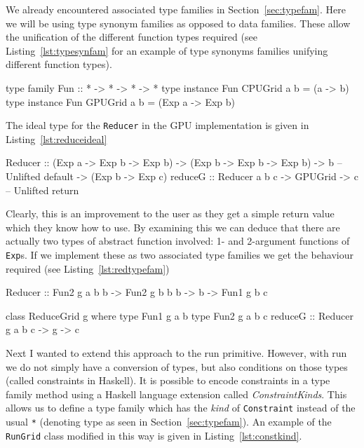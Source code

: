 \documentclass[12pt,a4paper,twoside]{scrbook}
\begin{document}
We already encountered associated type families in
Section~\ref{sec:typefam}. Here we will be using type synonym families as
opposed to data families. These allow the unification of the different function
types required (see Listing~\ref{lst:typesynfam} for an example of type synonyms
families unifying different function types).

\begin{hflisting}[label=lst:typesynfam, caption=The type synonym family is used
  as a type function. It is used to work out the element type of a collection.
  Here the \texttt{Fun} family (representing a one-argument function) can take
  two forms depending on the compilation target.]

type family Fun :: * -> * -> * -> *
type instance Fun CPUGrid a b = (a -> b)
type instance Fun GPUGrid a b = (Exp a -> Exp b)

\end{hflisting}


The ideal type for the \texttt{Reducer} in the GPU implementation is given in
Listing~\ref{lst:reduceideal}

\begin{hflisting}[label={lst:reduceideal}, caption={The optimal type for the
    reduce primitive under Accelerate.}]
Reducer :: (Exp a -> Exp b -> Exp b)
        -> (Exp b -> Exp b -> Exp b)
        -> b -- Unlifted default
        -> (Exp b -> Exp c)
reduceG :: Reducer a b c -> GPUGrid -> c -- Unlifted return
\end{hflisting}

Clearly, this is an improvement to the user as they get a simple return value
which they know how to use. By examining this we can deduce that there are
actually two types of abstract function involved: 1- and 2-argument functions of
\texttt{Exp}s. If we implement these as two associated type families we get the
behaviour required (see Listing~\ref{lst:redtypefam})

\begin{hflisting}[label={lst:redtypefam}, caption={The application of type
    families to the reduce primitive.}]
Reducer :: Fun2 g a b b
        -> Fun2 g b b b
        -> b
        -> Fun1 g b c

class ReduceGrid g where
    type Fun1 g a b
    type Fun2 g a b c
    reduceG :: Reducer g a b c -> g -> c
\end{hflisting}

Next I wanted to extend this approach to the run primitive. However, with run we
do not simply have a conversion of types, but also conditions on those types
(called constraints in Haskell). It is possible to encode constraints in a type
family method using a Haskell language extension called
\emph{ConstraintKinds}. This allows us to define a type family which has the
\emph{kind} of \texttt{Constraint} instead of the usual \texttt{*} (denoting
type as seen in Section~\ref{sec:typefam}). An example of the \texttt{RunGrid}
class modified in this way is given in Listing~\ref{lst:constkind}.
\end{document}

